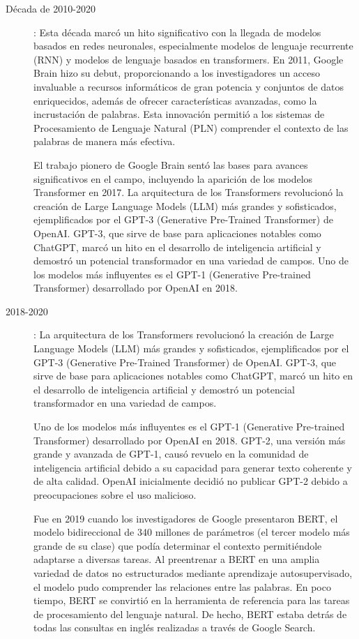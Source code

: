 \begin{description}
\item[Década de 2010-2020]: Esta década marcó un hito significativo con la llegada de modelos basados en redes neuronales, especialmente modelos de lenguaje recurrente (RNN) y modelos de lenguaje basados en transformers. 
En 2011, Google Brain hizo su debut, proporcionando a los investigadores un acceso invaluable a recursos informáticos de gran potencia y conjuntos de datos enriquecidos, además de ofrecer características avanzadas, como la incrustación de palabras. Esta innovación permitió a los sistemas de Procesamiento de Lenguaje Natural (PLN) comprender el contexto de las palabras de manera más efectiva. 

El trabajo pionero de Google Brain sentó las bases para avances significativos en el campo, incluyendo la aparición de los modelos Transformer en 2017. La arquitectura de los Transformers revolucionó la creación de Large Language Models (LLM) más grandes y sofisticados, ejemplificados por el GPT-3 (Generative Pre-Trained Transformer) de OpenAI. GPT-3, que sirve de base para aplicaciones notables como ChatGPT, marcó un hito en el desarrollo de inteligencia artificial y demostró un potencial transformador en una variedad de campos.
Uno de los modelos más influyentes es el GPT-1 (Generative Pre-trained Transformer) desarrollado por OpenAI en 2018.

\item[2018-2020]: La arquitectura de los Transformers revolucionó la creación de Large Language Models (LLM) más grandes y sofisticados, ejemplificados por el GPT-3 (Generative Pre-Trained Transformer) de OpenAI. GPT-3, que sirve de base para aplicaciones notables como ChatGPT, marcó un hito en el desarrollo de inteligencia artificial y demostró un potencial transformador en una variedad de campos.

Uno de los modelos más influyentes es el GPT-1 (Generative Pre-trained Transformer) desarrollado por OpenAI en 2018. GPT-2, una versión más grande y avanzada de GPT-1, causó revuelo en la comunidad de inteligencia artificial debido a su capacidad para generar texto coherente y de alta calidad. OpenAI inicialmente decidió no publicar GPT-2 debido a preocupaciones sobre el uso malicioso. 

Fue en 2019 cuando los investigadores de Google presentaron BERT, el modelo bidireccional de 340 millones de parámetros (el tercer modelo más grande de su clase) que podía determinar el contexto permitiéndole adaptarse a diversas tareas. Al preentrenar a BERT en una amplia variedad de datos no estructurados mediante aprendizaje autosupervisado, el modelo pudo comprender las relaciones entre las palabras. En poco tiempo, BERT se convirtió en la herramienta de referencia para las tareas de procesamiento del lenguaje natural. De hecho, BERT estaba detrás de todas las consultas en inglés realizadas a través de Google Search.


\end{description}

